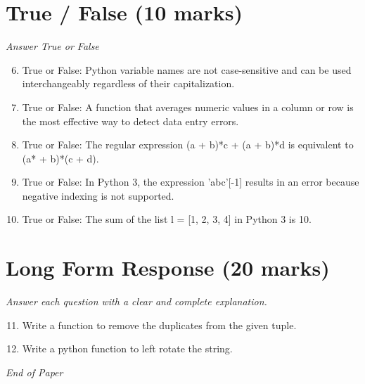 \documentclass[12pt]{article}
\begin{document}
\section*{True / False (10 marks)}
\textit{Answer True or False}
\begin{enumerate}[label=\arabic*.]
\setcounter{enumi}{5}
\item True or False: Python variable names are not case-sensitive and can be used interchangeably regardless of their capitalization.
\item True or False: A function that averages numeric values in a column or row is the most effective way to detect data entry errors.
\item True or False: The regular expression (a + b)*c + (a + b)*d is equivalent to (a* + b)*(c + d).
\item True or False: In Python 3, the expression 'abc'[-1] results in an error because negative indexing is not supported.
\item True or False: The sum of the list l = [1, 2, 3, 4] in Python 3 is 10.
\end{enumerate}

\section*{Long Form Response (20 marks)}
\textit{Answer each question with a clear and complete explanation.}
\begin{enumerate}[label=\arabic*.]
\setcounter{enumi}{10}
\item Write a function to remove the duplicates from the given tuple.
\item Write a python function to left rotate the string.
\end{enumerate}

\vfill
\noindent\textit{End of Paper}
\end{document}
